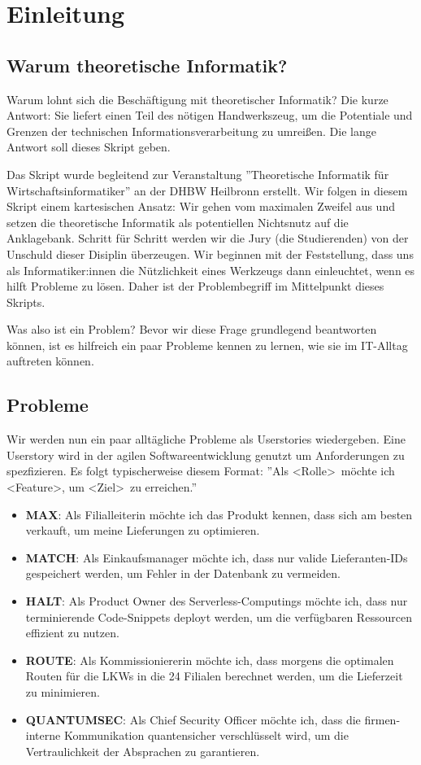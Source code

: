 \chapter{Einleitung}
\section{Warum theoretische Informatik?}
Warum lohnt sich die Beschäftigung mit theoretischer Informatik?
Die kurze Antwort: Sie liefert einen Teil des nötigen Handwerkszeug,
um die Potentiale und Grenzen der technischen Informationsverarbeitung zu umreißen.
Die lange Antwort soll dieses Skript geben.

Das Skript wurde begleitend zur Veranstaltung ''Theoretische Informatik für Wirtschaftsinformatiker''
an der DHBW Heilbronn erstellt.
Wir folgen in diesem Skript einem kartesischen Ansatz:
Wir gehen vom maximalen Zweifel aus und setzen die theoretische Informatik 
als potentiellen Nichtsnutz auf die Anklagebank.
Schritt für Schritt werden wir die Jury (die Studierenden) von der Unschuld dieser
Disiplin überzeugen.
Wir beginnen mit der Feststellung, dass uns als Informatiker:innen die Nützlichkeit
eines Werkzeugs dann einleuchtet, wenn es hilft Probleme zu lösen. 
Daher ist der Problembegriff im Mittelpunkt dieses Skripts.

Was also ist ein Problem?
Bevor wir diese Frage grundlegend beantworten können,
ist es hilfreich ein paar Probleme kennen zu lernen,
wie sie im IT-Alltag auftreten können.

\section{Probleme}
Wir werden nun ein paar alltägliche Probleme als Userstories wiedergeben.
Eine Userstory wird in der agilen Softwareentwicklung genutzt um Anforderungen zu spezfizieren.
Es folgt typischerweise diesem Format:
''Als \textless Rolle\textgreater\ möchte ich \textless Feature\textgreater,
um \textless Ziel\textgreater\ zu erreichen.''

\begin{itemize}
    \item \textbf{MAX}: Als Filialleiterin möchte ich das Produkt kennen,
        dass sich am besten verkauft, um meine Lieferungen zu optimieren.
    \item \textbf{MATCH}: Als Einkaufsmanager möchte ich,
        dass nur valide Lieferanten-IDs gespeichert werden,
        um Fehler in der Datenbank zu vermeiden.
    \item \textbf{HALT}: Als Product Owner des Serverless-Computings möchte ich,
        dass nur terminierende Code-Snippets deployt werden,
        um die verfügbaren Ressourcen effizient zu nutzen.
    \item \textbf{ROUTE}: Als Kommissioniererin möchte ich,
        dass morgens die optimalen Routen für die LKWs in die 24 Filialen berechnet werden,
        um die Lieferzeit zu minimieren.
    \item \textbf{QUANTUMSEC}: Als Chief Security Officer möchte ich,
        dass die firmen-interne Kommunikation quantensicher verschlüsselt wird,
        um die Vertraulichkeit der Absprachen zu garantieren.
\end{itemize}

